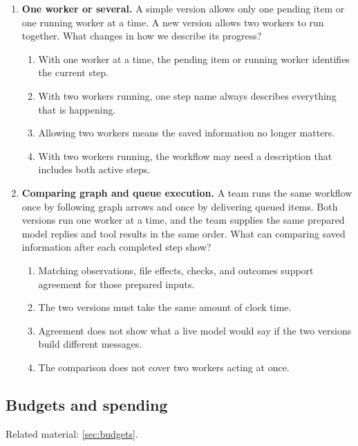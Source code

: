 \begin{enumerate}[start=41,itemsep=0.7\baselineskip]
\item\label{exercise:49} \begin{minipage}[t]{\linewidth}
\textbf{One worker or several.} A simple version allows only one pending item or one running worker at a time. A new version allows two workers to run together. What changes in how we describe its progress?
\begin{enumerate}[label=\textnormal{(\Alph*)},leftmargin=*,itemsep=0pt]
\item With one worker at a time, the pending item or running worker identifies the current step.
\item With two workers running, one step name always describes everything that is happening.
\item Allowing two workers means the saved information no longer matters.
\item With two workers running, the workflow may need a description that includes both active steps.
\end{enumerate}
\end{minipage}

\item\label{exercise:50} \begin{minipage}[t]{\linewidth}
\textbf{Comparing graph and queue execution.} A team runs the same workflow once by following graph arrows and once by delivering queued items. Both versions run one worker at a time, and the team supplies the same prepared model replies and tool results in the same order. What can comparing saved information after each completed step show?
\begin{enumerate}[label=\textnormal{(\Alph*)},leftmargin=*,itemsep=0pt]
\item Matching observations, file effects, checks, and outcomes support agreement for those prepared inputs.
\item The two versions must take the same amount of clock time.
\item Agreement does not show what a live model would say if the two versions build different messages.
\item The comparison does not cover two workers acting at once.
\end{enumerate}
\end{minipage}

\end{enumerate}

\subsection{Budgets and spending}
\noindent Related material: \cref{sec:budgets}.

